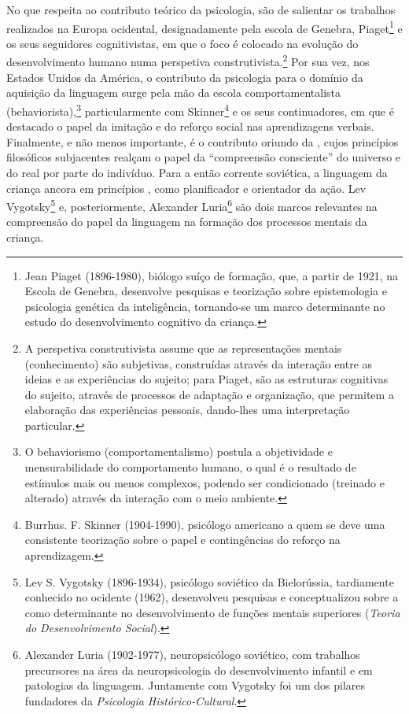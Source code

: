 \documentclass[output=paper]{LSP/langsci}
\begin{document}
No que respeita ao contributo teórico da psicologia, são de salientar os trabalhos realizados na Europa ocidental, designadamente pela escola de Genebra, Piaget\footnote{Jean Piaget (1896-1980), biólogo suíço de formação, que, a partir de 1921, na Escola de Genebra, desenvolve pesquisas e teorização sobre epistemologia e psicologia genética da inteligência, tornando-se um marco determinante no estudo do desenvolvimento cognitivo da criança.} e os seus seguidores cognitivistas, em que o foco é colocado na evolução do desenvolvimento humano numa perspetiva construtivista.\footnote{A perspetiva construtivista assume que as representações mentais (conhecimento) são subjetivas, construídas através da interação entre as ideias e as experiências do sujeito; para Piaget, são as estruturas cognitivas do sujeito, através de processos de adaptação e organização, que permitem a elaboração das experiências pessoais, dando-lhes uma interpretação particular.} Por sua vez, nos Estados Unidos da América, o contributo da psicologia para o domínio da aquisição da linguagem surge pela mão da escola comportamentalista (behaviorista),\footnote{O behaviorismo (comportamentalismo) postula a objetividade e mensurabilidade do comportamento humano, o qual é o resultado de estímulos mais ou menos complexos, podendo ser condicionado (treinado e alterado) através da interação com o meio ambiente.} particularmente com Skinner\footnote{Burrhus. F. Skinner (1904-1990), psicólogo americano a quem se deve uma consistente teorização sobre o papel e contingências do reforço na aprendizagem.} e os seus continuadores, em que é destacado o papel da imitação e do reforço social nas aprendizagens verbais.  Finalmente, e não menos importante, é o contributo oriundo da , cujos princípios filosóficos subjacentes realçam o papel da “compreensão consciente” do universo e do real por parte do indivíduo. Para a então corrente soviética, a linguagem da criança ancora em princípios , como planificador e orientador da ação. Lev Vygotsky\footnote{Lev S. Vygotsky (1896-1934), psicólogo soviético da Bielorússia, tardiamente conhecido no ocidente (1962), desenvolveu pesquisas e conceptualizou sobre a  como determinante no desenvolvimento de funções mentais superiores (\emph{Teoria do Desenvolvimento Social}).} e, posteriormente, Alexander Luria\footnote{Alexander Luria (1902-1977), neuropsicólogo soviético, com trabalhos precursores na área da neuropsicologia do desenvolvimento infantil e em patologias da linguagem. Juntamente com Vygotsky foi um dos pilares fundadores da \emph{Psicologia Histórico-Cultural}.} são dois marcos relevantes na compreensão do papel da linguagem na formação dos processos mentais da criança.
\end{document}
